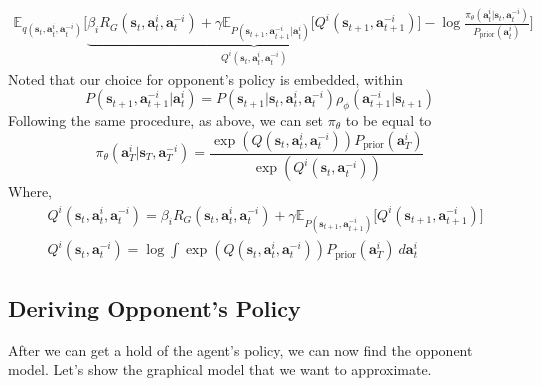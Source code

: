 \begin{equation}
    \begin{aligned}
        \mathbb{E}_{q(\boldsymbol{s}_{t}, \boldsymbol{a}^i_{t}, \boldsymbol{a}^{-i}_{t})} \Bigg[\underbrace{\beta_i R_G(\boldsymbol{s}_{t}, \boldsymbol{a}^i_{t}, \boldsymbol{a}^{-i}_{t}) + \gamma\mathbb{E}_{P(\boldsymbol{s}_{t+1}, \boldsymbol{a}^{-i}_{t+1} | \boldsymbol{a}^{i}_{t})}\Big[ Q^{i}(\boldsymbol{s}_{t+1}, \boldsymbol{a}^{-i}_{t+1}) \Big]}_{Q^i(\boldsymbol{s}_t, \boldsymbol{a}^i_t, \boldsymbol{a}^{-i}_t)} - \log \frac{\pi_{\theta}(\boldsymbol{a}^i_t | \boldsymbol{s}_t, \boldsymbol{a}^{-i}_t)}{P_{\text{prior}}(\boldsymbol{a}^i_t)} \Bigg]
    \end{aligned}
\end{equation}
Noted that our choice for opponent's policy is embedded, within 
\begin{equation}
    P(\boldsymbol{s}_{t+1}, \boldsymbol{a}^{-i}_{t+1} | \boldsymbol{a}^{i}_{t}) = P(\boldsymbol{s}_{t+1} | \boldsymbol{s}_t, \boldsymbol{a}^i_t, \boldsymbol{a}^{-i}_t) \rho_{\phi}(\boldsymbol{a}^{-i}_{t+1} | \boldsymbol{s}_{t+1})
\end{equation}
Following the same procedure, as above, we can set $\pi_{\theta}$ to be equal to 
\begin{equation}
    \pi_{\theta}(\boldsymbol{a}^i_T | \boldsymbol{s}_T, \boldsymbol{a}_T^{-i}) = \frac{\exp(Q(\boldsymbol{s}_t, \boldsymbol{a}^i_t, \boldsymbol{a}^{-i}_t)) P_{\text{prior}}(\boldsymbol{a}^i_T)}{\exp(Q^{i}(\boldsymbol{s}_t, \boldsymbol{a}^{-i}_t))}
\end{equation}
Where, 
\begin{equation}
    \begin{aligned}
        &Q^i(\boldsymbol{s}_t, \boldsymbol{a}^i_t, \boldsymbol{a}^{-i}_t) = \beta_i R_G(\boldsymbol{s}_{t}, \boldsymbol{a}^i_{t}, \boldsymbol{a}^{-i}_{t}) + \gamma \mathbb{E}_{P(\boldsymbol{s}_{t+1}, \boldsymbol{a}^{-i}_{t+1})}\Big[ Q^{i} (\boldsymbol{s}_{t+1}, \boldsymbol{a}^{-i}_{t+1}) \Big] \\
        & Q^{i}(\boldsymbol{s}_t, \boldsymbol{a}^{-i}_t) = \log \int \exp(Q(\boldsymbol{s}_t, \boldsymbol{a}^i_t, \boldsymbol{a}^{-i}_t)) P_{\text{prior}}(\boldsymbol{a}^i_T) \ d \boldsymbol{a}^i_t
    \end{aligned}
\end{equation}

\subsection{Deriving Opponent's Policy}
After we can get a hold of the agent's policy, we can now find the opponent model. Let's show the graphical model that we want to approximate. 

